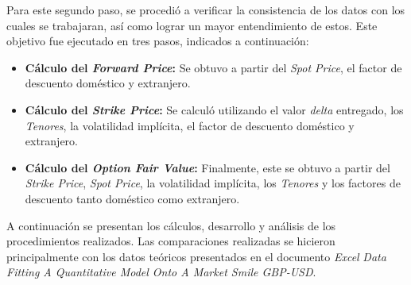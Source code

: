 Para este segundo paso, se procedió a verificar la consistencia de los datos con los cuales se trabajaran, así como lograr un mayor entendimiento de estos. Este objetivo fue ejecutado en tres pasos, indicados a continuación:

\begin{itemize}
    \item \textbf{Cálculo del \textit{Forward Price}:} Se obtuvo a partir del \textit{Spot Price}, el factor de descuento doméstico y extranjero.
    
    \item \textbf{Cálculo del \textit{Strike Price}:} Se calculó utilizando el valor \textit{delta} entregado, los \textit{Tenores}, la volatilidad implícita, el factor de descuento doméstico y extranjero.
    
    \item \textbf{Cálculo del \textit{Option Fair Value}:} Finalmente, este se obtuvo a partir del \textit{Strike Price}, \textit{Spot Price}, la volatilidad implícita, los \textit{Tenores} y los factores de descuento tanto doméstico como extranjero.
    
\end{itemize}

\noindent A continuación se presentan los cálculos, desarrollo y análisis de los procedimientos realizados. Las comparaciones realizadas se hicieron principalmente con los datos teóricos presentados en el documento \textit{Excel} \textit{Data Fitting A Quantitative Model Onto A Market Smile GBP-USD}.
\newpage
